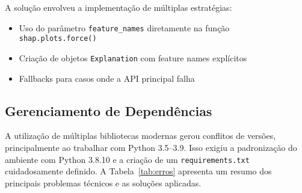 A solução envolveu a implementação de múltiplas estratégias:
\begin{itemize}
    \item Uso do parâmetro \texttt{feature\_names} diretamente na função \texttt{shap.plots.force()}
    \item Criação de objetos \texttt{Explanation} com feature names explícitos
    \item Fallbacks para casos onde a API principal falha
\end{itemize}

\subsection*{Gerenciamento de Dependências}

A utilização de múltiplas bibliotecas modernas gerou conflitos de versões, principalmente ao trabalhar com Python 3.5–3.9. Isso exigiu a padronização do ambiente com Python 3.8.10 e a criação de um \texttt{requirements.txt} cuidadosamente definido. A Tabela~\ref{tab:erros} apresenta um resumo dos principais problemas técnicos e as soluções aplicadas.

